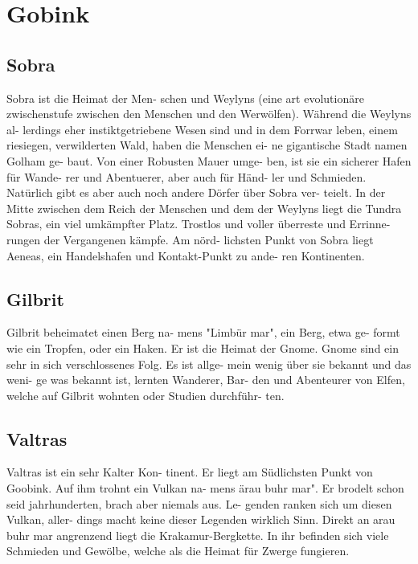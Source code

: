 \section{Gobink}

\subsection{Sobra}
Sobra ist die Heimat der Men-
schen und Weylyns (eine art evolutionäre
zwischenstufe zwischen den Menschen und
den Werwölfen). Während die Weylyns al-
lerdings eher instiktgetriebene Wesen sind
und in dem Forrwar leben, einem riesiegen,
verwilderten Wald, haben die Menschen ei-
ne gigantische Stadt namen Golham ge-
baut. Von einer Robusten Mauer umge-
ben, ist sie ein sicherer Hafen für Wande-
rer und Abentuerer, aber auch für Händ-
ler und Schmieden. Natürlich gibt es aber
auch noch andere Dörfer über Sobra ver-
teielt. In der Mitte zwischen dem Reich der
Menschen und dem der Weylyns liegt die
Tundra Sobras, ein viel umkämpfter Platz.
Trostlos und voller überreste und Errinne-
rungen der Vergangenen kämpfe. Am nörd-
lichsten Punkt von Sobra liegt Aeneas, ein
Handelshafen und Kontakt-Punkt zu ande-
ren Kontinenten.

\subsection{Gilbrit}
Gilbrit beheimatet einen Berg na-
mens "Limbür mar", ein Berg, etwa ge-
formt wie ein Tropfen, oder ein Haken. Er
ist die Heimat der Gnome. Gnome sind ein
sehr in sich verschlossenes Folg. Es ist allge-
mein wenig über sie bekannt und das weni-
ge was bekannt ist, lernten Wanderer, Bar-
den und Abenteurer von Elfen, welche auf
Gilbrit wohnten oder Studien durchführ-
ten.

\subsection{Valtras}
Valtras ist ein sehr Kalter Kon-
tinent. Er liegt am Südlichsten Punkt von
Goobink. Auf ihm trohnt ein Vulkan na-
mens ärau buhr mar". Er brodelt schon seid
jahrhunderten, brach aber niemals aus. Le-
genden ranken sich um diesen Vulkan, aller-
dings macht keine dieser Legenden wirklich
Sinn. Direkt an arau buhr mar angrenzend
liegt die Krakamur-Bergkette. In ihr befinden
sich viele Schmieden und Gewölbe, welche
als die Heimat für Zwerge fungieren.

\newpage

